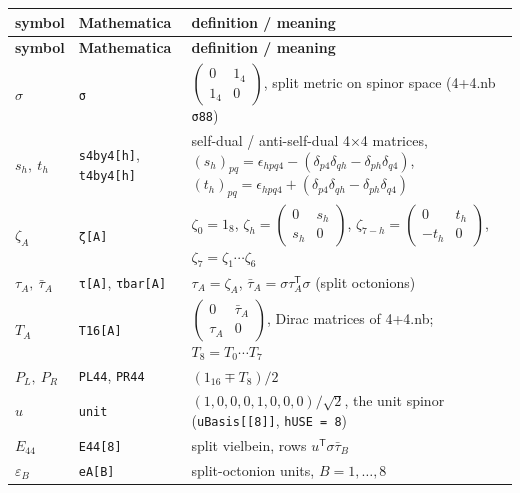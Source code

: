 \documentclass[10pt,a4paper]{article}
\begin{document}
{\small
\begin{longtable}{>{\raggedright\arraybackslash}p{}>{\raggedright\arraybackslash}p{}>{\raggedright\arraybackslash}p{}}
\toprule
\textbf{symbol} & \textbf{Mathematica} & \textbf{definition / meaning} \\
\midrule\endfirsthead
\toprule
\textbf{symbol} & \textbf{Mathematica} & \textbf{definition / meaning} \\
\midrule\endhead
\endfoot
\bottomrule\endlastfoot
$\sigma$ & \texttt{σ} & $\left(\begin{smallmatrix}0&1_4\\1_4&0\end{smallmatrix}\right)$, split metric on spinor space (4+4.nb \texttt{σ88}) \\
$s_h,\ t_h$ & \texttt{s4by4[h]}, \texttt{t4by4[h]} & self-dual / anti-self-dual 4×4 matrices, $(s_h)_{pq}=\epsilon_{hpq4}-(\delta_{p4}\delta_{qh}-\delta_{ph}\delta_{q4})$, $(t_h)_{pq}=\epsilon_{hpq4}+(\delta_{p4}\delta_{qh}-\delta_{ph}\delta_{q4})$ \\
$\zeta_A$ & \texttt{ζ[A]} & $\zeta_0=1_8$, $\zeta_h=\left(\begin{smallmatrix}0&s_h\\s_h&0\end{smallmatrix}\right)$, $\zeta_{7-h}=\left(\begin{smallmatrix}0&t_h\\-t_h&0\end{smallmatrix}\right)$, $\zeta_7=\zeta_1\cdots\zeta_6$ \\
$\tau_A,\ \bar\tau_A$ & \texttt{τ[A]}, \texttt{τbar[A]} & $\tau_A=\zeta_A$, $\bar\tau_A=\sigma\tau_A^{\mathsf T}\sigma$ (split octonions) \\
$T_A$ & \texttt{T16[A]} & $\left(\begin{smallmatrix}0&\bar\tau_A\\\tau_A&0\end{smallmatrix}\right)$, Dirac matrices of 4+4.nb; $T_8=T_0\cdots T_7$ \\
$P_L,\ P_R$ & \texttt{PL44}, \texttt{PR44} & $(1_{16}\mp T_8)/2$ \\
$u$ & \texttt{unit} & $(1,0,0,0,1,0,0,0)/\sqrt2$, the unit spinor (\texttt{uBasis[[8]]}, \texttt{hUSE = 8}) \\
$E_{44}$ & \texttt{E44[8]} & split vielbein, rows $u^{\mathsf T}\sigma\bar\tau_B$ \\
$\varepsilon_B$ & \texttt{eA[B]} & split-octonion units, $B=1,\dots,8$ \\

\end{longtable}}
\end{document}
